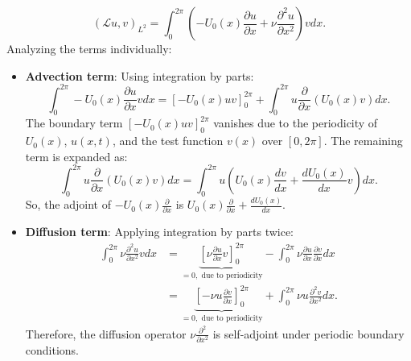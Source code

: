 \begin{equation}
	(\mathcal{L}u, v)_{L^2} = \int_0^{2\pi} \left( -U_0(x) \frac{\partial u}{\partial x} + \nu \frac{\partial^2 u}{\partial x^2} \right) v dx.
	\label{eq:adjoint_l_star_integral}
\end{equation}
Analyzing the terms individually:
\begin{itemize}
	\item \textbf{Advection term}: Using integration by parts:
	      \begin{equation}
		      \int_0^{2\pi} - U_0 (x) \frac{\partial u}{\partial x} v dx = \left [ -U_0(x) u v \right]_0^{2\pi} + \int_0^{2\pi} u \frac{\partial}{\partial x} \left ( U_0(x) v\right) dx.
		      \label{eq:adv_term_parts}
	      \end{equation}
	      The boundary term $\left [ -U_0(x) u v \right]_0^{2\pi}$ vanishes due to the periodicity of $U_0(x)$, $u(x,t)$, and the test function $v(x)$ over $[0, 2\pi]$. The remaining term is expanded as:
	      \begin{equation}
		      \int_0^{2\pi} u \frac{\partial}{\partial x} \left ( U_0(x) v\right) dx = \int_0^{2\pi} u \left ( U_0(x) \frac{dv}{dx} +  \frac{d U_0(x)}{d x} v \right) dx.
		      \label{eq:adv_term_expanded}
	      \end{equation}
	      So, the adjoint of $-U_0(x) \frac{\partial}{\partial x}$ is $U_0(x) \frac{\partial}{\partial x} + \frac{d U_0(x)}{dx}$.
	\item \textbf{Diffusion term}: Applying integration by parts twice:
	      \begin{equation}
		      \begin{aligned}
			      \int_0^{2 \pi} \nu \frac{\partial^2 u }{\partial x^2} v dx & = \underbrace{\left [ \nu \frac{\partial u}{\partial x} v \right]_0^{2\pi}}_{=0, \text{ due to periodicity}} - \int_0^{2\pi} \nu \frac{\partial u}{\partial x} \frac{\partial v}{\partial x} dx \\
			                                                                 & =  \underbrace{\left [ -\nu u \frac{\partial v}{\partial x} \right]_0^{2\pi}}_{=0, \text{ due to periodicity}} + \int_0^{2\pi} \nu u \frac{\partial^2 v}{\partial x^2} dx.
			      \label{eq:diff_term_parts}
		      \end{aligned}
	      \end{equation}
	      Therefore, the diffusion operator $\nu \frac{\partial^2}{\partial x^2}$ is self-adjoint under periodic boundary conditions.
\end{itemize}
